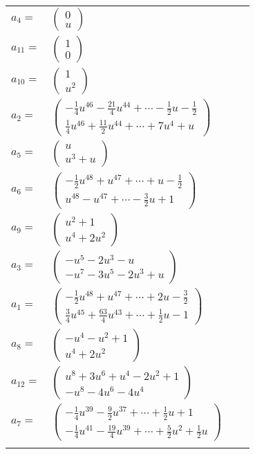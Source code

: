 \documentclass[1p]{elsarticle_modified}
\theoremstyle{definition}
\begin{document}
\begin{tabular}{m{7pt} m{180pt} m{7pt} m{180pt} }
\flushright $a_{4}=$&$\begin{pmatrix}0\\u\end{pmatrix}$ \\
\flushright $a_{11}=$&$\begin{pmatrix}1\\0\end{pmatrix}$ \\
\flushright $a_{10}=$&$\begin{pmatrix}1\\u^2\end{pmatrix}$ \\
\flushright $a_{2}=$&$\begin{pmatrix}-\frac{1}{4} u^{46}-\frac{21}{4} u^{44}+\cdots-\frac{1}{2} u-\frac{1}{2}\\\frac{1}{4} u^{46}+\frac{11}{2} u^{44}+\cdots+7 u^4+u\end{pmatrix}$ \\
\flushright $a_{5}=$&$\begin{pmatrix}u\\u^3+u\end{pmatrix}$ \\
\flushright $a_{6}=$&$\begin{pmatrix}-\frac{1}{2} u^{48}+u^{47}+\cdots+u-\frac{1}{2}\\u^{48}- u^{47}+\cdots-\frac{3}{2} u+1\end{pmatrix}$ \\
\flushright $a_{9}=$&$\begin{pmatrix}u^2+1\\u^4+2 u^2\end{pmatrix}$ \\
\flushright $a_{3}=$&$\begin{pmatrix}- u^5-2 u^3- u\\- u^7-3 u^5-2 u^3+u\end{pmatrix}$ \\
\flushright $a_{1}=$&$\begin{pmatrix}-\frac{1}{2} u^{48}+u^{47}+\cdots+2 u-\frac{3}{2}\\\frac{3}{4} u^{45}+\frac{63}{4} u^{43}+\cdots+\frac{1}{2} u-1\end{pmatrix}$ \\
\flushright $a_{8}=$&$\begin{pmatrix}- u^4- u^2+1\\u^4+2 u^2\end{pmatrix}$ \\
\flushright $a_{12}=$&$\begin{pmatrix}u^8+3 u^6+u^4-2 u^2+1\\- u^8-4 u^6-4 u^4\end{pmatrix}$ \\
\flushright $a_{7}=$&$\begin{pmatrix}-\frac{1}{4} u^{39}-\frac{9}{2} u^{37}+\cdots+\frac{1}{2} u+1\\-\frac{1}{4} u^{41}-\frac{19}{4} u^{39}+\cdots+\frac{5}{2} u^2+\frac{1}{2} u\end{pmatrix}$\\&\end{tabular}
\end{document}
